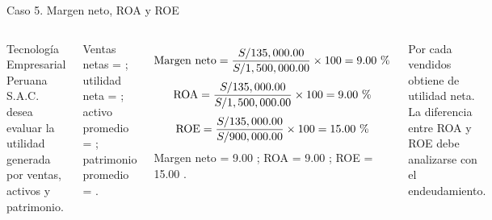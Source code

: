 \begin{frame}{Caso 5. Margen neto, ROA y ROE}
\smallcase
\begin{columns}[T,totalwidth=\textwidth]
 Tecnología Empresarial Peruana S.A.C. desea evaluar la utilidad generada por ventas, activos y patrimonio.

 Ventas netas = ; utilidad neta = ; activo promedio = ; patrimonio promedio = .

\[
\text{Margen neto}=\frac{\soles{135,000.00}}{\soles{1,500,000.00}}\times100=9.00\text{ \pct}
\]
\[
\text{ROA}=\frac{\soles{135,000.00}}{\soles{1,500,000.00}}\times100=9.00\text{ \pct}
\]
\[
\text{ROE}=\frac{\soles{135,000.00}}{\soles{900,000.00}}\times100=15.00\text{ \pct}
\]
 Margen neto = 9.00 \pct; ROA = 9.00 \pct; ROE = 15.00 \pct.

 Por cada  vendidos obtiene  de utilidad neta. La diferencia entre ROA y ROE debe analizarse con el endeudamiento.

\centering
{}
\end{columns}
\end{frame}
